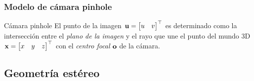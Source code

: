 \documentclass[compress]{beamer}
\begin{document}
\begin{frame}
\frametitle{Modelo de cámara pinhole}

\begin{block}{Cámara pinhole}
El punto de la imagen $\boldsymbol{\mathbf{u}}=\begin{bmatrix}u & v\end{bmatrix}^{\top}$ es determinado como la intersección entre el \emph{plano de la imagen} y el rayo que une el punto del mundo 3D $\boldsymbol{\mathbf{x}}=\begin{bmatrix}x & y & z\end{bmatrix}^{\top}$ con el \emph{centro focal} $\boldsymbol{\mathbf{o}}$ de la cámara.
\end{block}

\begin{figure}[!htb]
	\centering
	\hfill
\end{figure}

\end{frame}


\subsection{Geometría estéreo}
\end{document}
